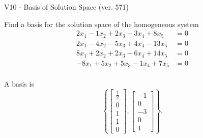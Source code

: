 \begin{exercise}
  \begin{exerciseTitle}V10 - Basis of Solution Space (ver. 571)\end{exerciseTitle}
  \begin{exerciseStatement}
    Find a basis for the solution space of the homogeneous system 
\begin{align*}
 2 x_ 1 -1 x_ 2 + 2 x_ 3 -3 x_ 4 + 8 x_ 5 &= 0  \\ 
  2 x_ 1 -4 x_ 2 -5 x_ 3 + 4 x_ 4 -13 x_ 5 &= 0  \\ 
  8 x_ 1 + 2 x_ 2 + 2 x_ 3 -6 x_ 4 + 14 x_ 5 &= 0  \\ 
  -8 x_ 1 + 5 x_ 2 + 5 x_ 3 -1 x_ 4 + 7 x_ 5 &= 0  \\ 
 \end{align*}


 
  \end{exerciseStatement}

  \begin{exerciseAnswer}
   A basis is   
\[\left\{\left[\begin{array}{c}
\frac{1}{2} \\
0 \\
1 \\
1 \\
0
\end{array}\right] , \left[\begin{array}{c}
-1 \\
0 \\
-3 \\
0 \\
1
\end{array}\right]\right\}.\]

  


  \end{exerciseAnswer}
\end{exercise}